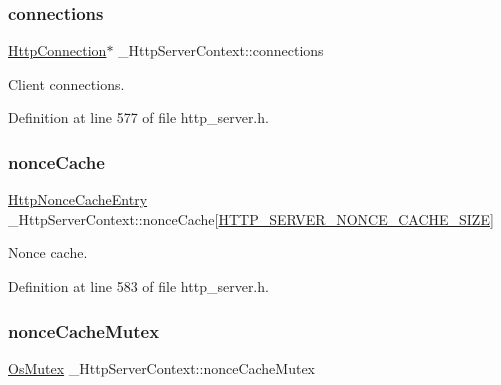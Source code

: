 \subsubsection{\texorpdfstring{connections}{connections}}
{\footnotesize\ttfamily \hyperlink{http__server_8h_a3506ecffde998ab02629dca83587d2f9}{Http\+Connection}$\ast$ \+\_\+\+Http\+Server\+Context\+::connections}



Client connections. 



Definition at line 577 of file http\+\_\+server.\+h.

\mbox{\label{struct__HttpServerContext_ab32838f640fd623c445ee692a5819b60}} 
\subsubsection{\texorpdfstring{nonce\+Cache}{nonceCache}}
{\footnotesize\ttfamily \hyperlink{structHttpNonceCacheEntry}{Http\+Nonce\+Cache\+Entry} \+\_\+\+Http\+Server\+Context\+::nonce\+Cache\mbox{[}\hyperlink{http__server_8h_ad440bedce9872300d063b72fa5e2cd7a}{H\+T\+T\+P\+\_\+\+S\+E\+R\+V\+E\+R\+\_\+\+N\+O\+N\+C\+E\+\_\+\+C\+A\+C\+H\+E\+\_\+\+S\+I\+ZE}\mbox{]}}



Nonce cache. 



Definition at line 583 of file http\+\_\+server.\+h.

\mbox{\label{struct__HttpServerContext_a7de91a857fc86e020d261d136e0db85d}} 
\subsubsection{\texorpdfstring{nonce\+Cache\+Mutex}{nonceCacheMutex}}
{\footnotesize\ttfamily \hyperlink{structOsMutex}{Os\+Mutex} \+\_\+\+Http\+Server\+Context\+::nonce\+Cache\+Mutex}



